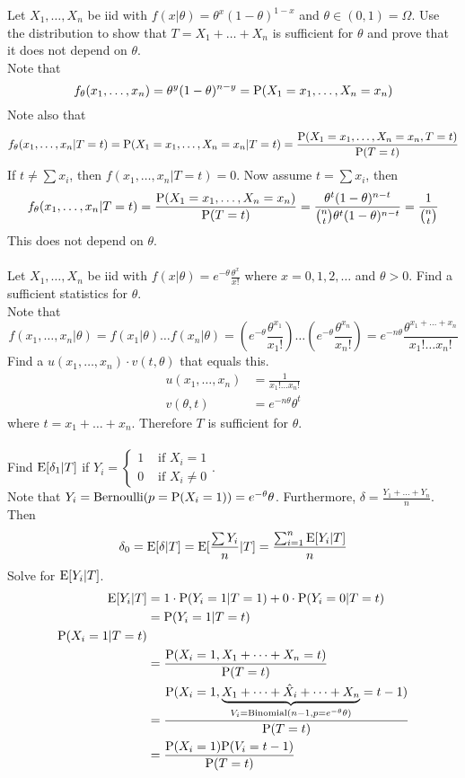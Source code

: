 \documentclass[12pt]{article}
\begin{document}
Let $X_1,\dots,X_n$ be iid with $f(x|\theta) = \theta^x(1-\theta)^{1-x}$ and $\theta \in (0,1) = \Omega$. Use the distribution to show that $T = X_1 + \dots + X_n$ is sufficient for $\theta$ and prove that it does not depend on $\theta$. \\
Note that $$f_\theta(x_1,\dots,x_n) = \theta^y(1-\theta)^{n-y} = \mathrm{P}( X_1 = x_1,\dots,X_n = x_n )$$ 
Note also that $$f_\theta(x_1,\dots,x_n | T=t) = \mathrm{P}( X_1 = x_1,\dots,X_n = x_n | T=t ) = \frac{\mathrm{P}( X_1=x_1,\dots,X_n=x_n, T=t )}{\mathrm{P}( T=t )}$$ 
If $t \neq \sum x_i$, then $f(x_1,\dots,x_n | T=t) = 0$. Now assume $t = \sum x_i$, then $$f_\theta(x_1,\dots,x_n|T = t) = \frac{\mathrm{P}( X_1=x_1,\dots,X_n=x_n )}{\mathrm{P}( T=t )} = \frac{\theta^t(1-\theta)^{n-t}}{\binom{n}{t}\theta^t(1-\theta)^{n-t}} = \frac{1}{\binom{n}{t}} $$ This does not depend on $\theta$. \\~\\
Let $X_1,\dots,X_n$ be iid with $f(x|\theta) = e^{-\theta}\frac{\theta^x}{x!}$ where $x = 0,1,2,\dots$ and $\theta > 0$. Find a sufficient statistics for $\theta$. \\
Note that $$f(x_1,\dots,x_n | \theta) = f(x_1|\theta)\dots f(x_n|\theta) = (e^{-\theta} \frac{\theta^{x_1}}{x_1!})\dots (e^{-\theta} \frac{\theta^{x_n}}{x_n!}) = e^{-n\theta}\frac{\theta^{x_1 + \dots + x_n}}{x_1!\dots x_n!} $$ Find a $u(x_1,\dots,x_n)\cdot v(t,\theta)$ that equals this. 
$$ \begin{aligned} u(x_1,\dots,x_n) &= \frac{1}{x_1!\dots x_n!} \\ v(\theta, t) &= e^{-n\theta} \theta^t \end{aligned} $$ where $t = x_1 + \dots + x_n$.  Therefore $T$ is sufficient for $\theta$. \\~\\
Find $\mathrm{E}[ \delta_1|T ]$ if $Y_i = \begin{cases} 1 &\text{ if } X_i = 1 \\ 0 &\text{ if } X_i \neq 0 \end{cases} $. \\
Note that $Y_i = \mathrm{Bernoulli}( p = \mathrm{P}( X_i = 1 ) ) = e^{-\theta} \theta$. Furthermore, $\delta = \frac{Y_1 + \dots + Y_n}{n}$. Then $$\delta_0 = \mathrm{E}[ \delta | T ] = \mathrm{E}[ \frac{\sum Y_i}{n} | T ] = \frac{\sum_{i=1}^n \mathrm{E}[ Y_i|T ]}{n} $$ 
Solve for $\mathrm{E}[ Y_i|T ]$. $$ \begin{aligned} 
\mathrm{E}[ Y_i|T ] &= 1 \cdot \mathrm{P}( Y_i = 1 | T=1 ) + 0 \cdot \mathrm{P}( Y_i = 0 | T = t ) \\ &= \mathrm{P}( Y_i = 1 | T =t ) \\
\mathrm{P}( X_i = 1 | T = t ) \\ &= \frac{\mathrm{P}( X_i = 1, X_1 + \dots + X_n = t )}{\mathrm{P}( T = t )} \\ &= \frac{\mathrm{P}( X_i = 1, \underbrace{X_1 + \dots + \hat{X}_i + \dots + X_n}_{V_i = \text{Binomial}(n-1, p = e^{-\theta} \theta)} = t - 1 )}{\mathrm{P}( T = t )} \\ &= \frac{\mathrm{P}( X_i = 1 ) \mathrm{P}( V_i = t-1 )}{\mathrm{P}( T =t )} \end{aligned} $$
\end{document}
